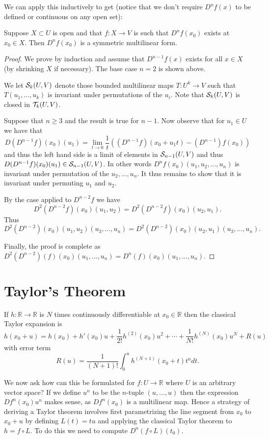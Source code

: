 \documentclass[twoside, a4paper, 10pt]{amsart}
\begin{document}
We can apply this inductively to get (notice that we don't require $D^nf(x)$ to be defined or continuous on any open set): 
\begin{thm} Suppose $X \subset U$ is open and that $f:X \to V$ is such that $D^nf(x_0)$ exists at $x_0 \in X$. Then $D^nf(x_0)$ is a symmetric multilinear form. \end{thm}

\begin{proof} We prove by induction and assume that $D^{n-1}f(x)$ exists for all $x \in X$ (by shrinking $X$ if necessary). The base case $n=2$ is shown above. 

We let $\mathcal{S}_{k}(U,V)$ denote those bounded multilinear maps $T:U^k \to V$ such that $T(u_1, \ldots, u_k)$ is invariant under permutations of the $u_i$. Note that $\mathcal{S}_{k}(U,V)$ is closed in $\mathcal{T}_k(U,V)$.

Suppose that $n \geq 3$ and the result is true for $n-1$. 
Now observe that for $u_1 \in U$ we have that  $$D(D^{n-1}f)(x_0)(u_1) = \lim_{t \to 0} \frac{1}{t}\left( (D^{n-1}f)(x_0 + u_1t) - (D^{n-1})f(x_0) \right)$$ and thus the left hand side is a limit of elements in $\mathcal{S}_{n-1}(U,V)$ and thus $D(D^{n-1}f)(x_0)(u_1) \in \mathcal{S}_{n-1}(U,V)$. In other words $D^{n}f(x_0)(u_1, u_2, \ldots, u_n)$ is invariant under permutation of the $u_2, \ldots, u_n$. It thus remains to show that it is invariant under permuting $u_1$ and $u_2$.

By the case applied to $D^{n-2}f$ we have $$D^2(D^{n-2}f)(x_0)(u_1,u_2) = D^2(D^{n-2}f)(x_0)(u_2,u_1).$$
Thus $$D^2(D^{n-2})(x_0)(u_1,u_2)(u_3, \ldots, u_n) = D^2(D^{n-2})(x_0)(u_2,u_1)(u_3, \ldots, u_n).$$

Finally, the proof is complete as $D^2(D^{n-2})(f)(x_0)(u_1, \ldots, u_n) = D^{n}(f)(x_0)(u_1, \ldots, u_n)$.
\end{proof}

\section{Taylor's Theorem}

If $h: \mathbb{R} \to \mathbb{R}$ is $N$ times continuously differentiable at $x_0 \in \mathbb{R}$ then the classical Taylor expansion is $$h(x_0 + u) = h(x_0) + h'(x_0)u + \frac{1}{2!}h^{(2)}(x_0)u^2 + \cdots + \frac{1}{N!}h^{(N)}(x_0)u^N + R(u)$$ with error term $$R(u) = \frac{1}{(N+1)!} \int_{0}^u h^{(N+1)}(x_0 + t) t^n dt.$$ 

We now ask how can this be formulated for $f:U \to \mathbb{R}$ where $U$ is an arbitrary vector space? If we define $u^n$ to be the $n$-tuple $(u, \ldots, u)$ then the expression $Df^n(x_0) u^n$ makes sense, as $Df^n(x_0)$ is a multilinear map. Hence a strategy of deriving a Taylor theorem involves first parametrizing the line segment from $x_0$ to $x_0 + u$ by defining $L(t) = tu$ and applying the classical Taylor theorem to $h = f \circ L$. To do this we need to compute $D^n(f \circ L) (t_0)$. 
\end{document}
